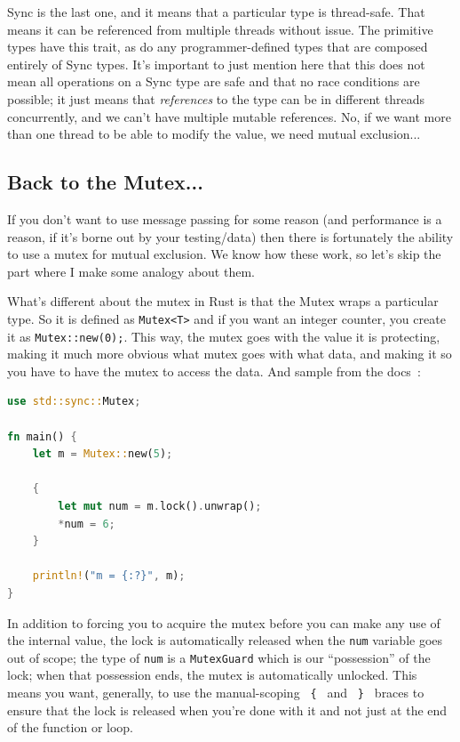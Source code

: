 Sync is the last one, and it means that a particular type is thread-safe. That means it can be referenced from multiple threads without issue. The primitive types have this trait, as do any programmer-defined types that are composed entirely of Sync types. It's important to just mention here that this does not mean all operations on a Sync type are safe and that no race conditions are possible; it just means that \textit{references} to the type can be in different threads concurrently, and we can't have multiple mutable references. No, if we want more than one thread to be able to modify the value, we need mutual exclusion...

\subsection*{Back to the Mutex...}
If you don't want to use message passing for some reason (and performance is a reason, if it's borne out by your testing/data) then there is fortunately the ability to use a mutex for mutual exclusion. We know how these work, so let's skip the part where I make some analogy about them. 

What's different about the mutex in Rust is that the Mutex wraps a particular type. So it is defined as \texttt{Mutex<T>} and if you want an integer counter, you create it as \texttt{Mutex::new(0);}. This way, the mutex goes with the value it is protecting, making it much more obvious what mutex goes with what data, and making it so you have to have the mutex to access the data. And sample from the docs~\cite{rustdocs}:

\begin{lstlisting}[language=Rust]
use std::sync::Mutex;

fn main() {
    let m = Mutex::new(5);

    {
        let mut num = m.lock().unwrap();
        *num = 6;
    }

    println!("m = {:?}", m);
}
\end{lstlisting}

In addition to forcing you to acquire the mutex before you can make any use of the internal value, the lock is automatically released when the \texttt{num} variable goes out of scope; the type of \texttt{num} is a \texttt{MutexGuard} which is our ``possession'' of the lock; when that possession ends, the mutex is automatically unlocked. This means you want, generally, to use the manual-scoping \texttt{ \{ } and \texttt{ \} } braces to ensure that the lock is released when you're done with it and not just at the end of the function or loop.

